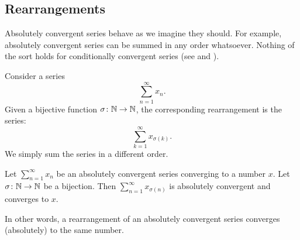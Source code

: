 \subsection{Rearrangements}

Absolutely convergent series behave as we imagine they should.  For example,
absolutely convergent series can be summed in any order whatsoever.  Nothing
of the sort holds for conditionally convergent series
(see 
and ).

Consider a series
\begin{equation*}
\sum_{n=1}^\infty x_n .
\end{equation*}
Given a bijective function $\sigma \colon {\mathbb{N}} \to {\mathbb{N}}$, the corresponding
rearrangement is the 
series:
\begin{equation*}
\sum_{k=1}^\infty x_{\sigma(k)} .
\end{equation*}
We simply sum the series in a different order.

\begin{prop}
Let $\sum_{n=1}^\infty x_n$ be an absolutely convergent series converging to a number
$x$.  Let $\sigma \colon {\mathbb{N}} \to {\mathbb{N}}$ be a bijection.  Then
$\sum_{n=1}^\infty x_{\sigma(n)}$ is absolutely convergent and converges to $x$.
\end{prop}

In other words,
a rearrangement of an absolutely convergent series converges (absolutely)
to the same number.


